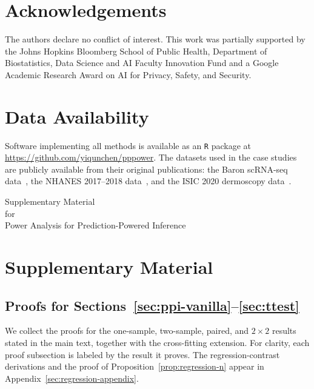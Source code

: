 \documentclass[12pt]{article}
\providecommand{\PPIFiguresAtEnd}{}
\providecommand{\PPIBibliographyBlock}{}
\renewcommand{\PPIBibliographyBlock}{%
{\begingroup
\setlength{\bibsep}{2pt}


\endgroup}
}
\begin{document}
\section*{Acknowledgements}
The authors declare no conflict of interest. This work was partially supported by the Johns Hopkins Bloomberg School of Public Health, Department of Biostatistics, Data Science and AI Faculty Innovation Fund and a Google Academic Research Award on AI for Privacy, Safety, and Security.

\section*{Data Availability}
Software implementing all methods is available as an \texttt{R} package at \url{https://github.com/yiqunchen/pppower}. The datasets used in the case studies are publicly available from their original publications: the Baron scRNA-seq data~\citep{baron2016single}, the NHANES 2017--2018 data~\citep{nhanes2020}, and the ISIC 2020 dermoscopy data~\citep{rotemberg2021patient}.

\PPIBibliographyBlock

\PPIFiguresAtEnd

\clearpage
\thispagestyle{empty}
\begin{center}
{\fontsize{16}{19}\selectfont Supplementary Material}\\[1.5em]
{\fontsize{16}{19}\selectfont for}\\[1.5em]
{\fontsize{16}{19}\selectfont Power Analysis for Prediction-Powered Inference}
\end{center}

\vspace{1.5em}
\appendix
\setcounter{table}{0}
\setcounter{figure}{0}
\renewcommand{\thetable}{S\arabic{table}}
\renewcommand{\thefigure}{S\arabic{figure}}
\renewcommand{\theHtable}{supp.\arabic{table}}
\renewcommand{\theHfigure}{supp.\arabic{figure}}
\section{Supplementary Material}
\label{sec:appendix}

\subsection{Proofs for Sections~\ref{sec:ppi-vanilla}--\ref{sec:ttest}}
\label{sec:proofs-main}

We collect the proofs for the one-sample, two-sample, paired, and
$2\times 2$ results stated in the main text, together with the
cross-fitting extension. For clarity, each proof
subsection is labeled by the result it proves. The regression-contrast
derivations and the proof of
Proposition~\ref{prop:regression-n} appear in
Appendix~\ref{sec:regression-appendix}.


\end{document}
